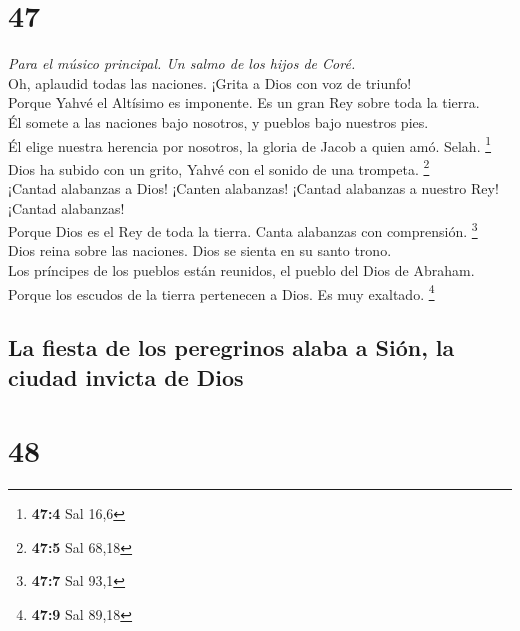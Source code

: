 \hypertarget{section-45}{%
\section{47}\label{section-45}}

\emph{Para el músico principal. Un salmo de los hijos de Coré.}\\
 Oh, aplaudid todas las naciones. ¡Grita a Dios con voz de
triunfo!\\
 Porque Yahvé el Altísimo es imponente. Es un gran Rey
sobre toda la tierra.\\
 Él somete a las naciones bajo nosotros, y pueblos bajo
nuestros pies.\\
 Él elige nuestra herencia por nosotros, la gloria de
Jacob a quien amó. Selah. \footnote{\textbf{47:4} Sal 16,6}\\
 Dios ha subido con un grito, Yahvé con el sonido de una
trompeta. \footnote{\textbf{47:5} Sal 68,18}\\
 ¡Cantad alabanzas a Dios! ¡Canten alabanzas! ¡Cantad
alabanzas a nuestro Rey! ¡Cantad alabanzas!\\
 Porque Dios es el Rey de toda la tierra. Canta alabanzas
con comprensión. \footnote{\textbf{47:7} Sal 93,1}\\
 Dios reina sobre las naciones. Dios se sienta en su santo
trono.\\
 Los príncipes de los pueblos están reunidos, el pueblo
del Dios de Abraham. Porque los escudos de la tierra pertenecen a Dios.
Es muy exaltado. \footnote{\textbf{47:9} Sal 89,18}

\hypertarget{la-fiesta-de-los-peregrinos-alaba-a-siuxf3n-la-ciudad-invicta-de-dios}{%
\subsection{La fiesta de los peregrinos alaba a Sión, la ciudad invicta
de
Dios}\label{la-fiesta-de-los-peregrinos-alaba-a-siuxf3n-la-ciudad-invicta-de-dios}}

\hypertarget{section-46}{%
\section{48}\label{section-46}}


